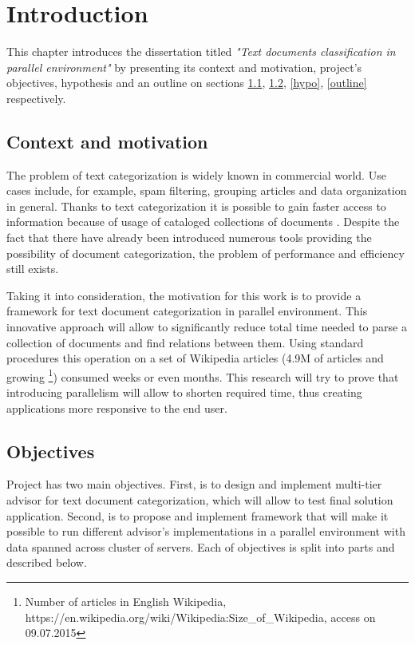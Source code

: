 \chapter{Introduction}
\label{int}

This chapter introduces the dissertation titled \textit{"Text documents classification in parallel environment"} by presenting its context and motivation, project’s objectives, hypothesis and an outline on sections \ref{con_mon}, \ref{obj}, \ref{hypo}, \ref{outline} respectively.

\section{Context and motivation}
\label{con_mon}
The problem of text categorization is widely known in commercial world. Use cases include, for example, spam filtering, grouping articles and data organization in general. Thanks to text categorization it is possible to gain faster access to information because of usage of cataloged collections of documents \cite{aut_wiki_cat_8}. Despite the fact that there have already been introduced numerous tools providing the possibility of document categorization, the problem of performance and efficiency still exists.

Taking it into consideration, the motivation for this work is to provide a framework for text document categorization in parallel environment. This innovative approach will allow to significantly reduce total time needed to parse a collection of documents and find relations between them. Using standard procedures this operation on a set of Wikipedia articles (4.9M of articles and growing \cite{wiki_art_num} \footnote{Number of articles in English Wikipedia, https://en.wikipedia.org/wiki/Wikipedia:Size\_of\_Wikipedia, access on 09.07.2015}) consumed weeks or even months. This research will try to prove that introducing parallelism will allow to shorten required time, thus creating applications more responsive to the end user.

\section{Objectives}
\label{obj}
Project has two main objectives. First, is to design and implement multi-tier advisor for text document categorization, which will allow to test final solution application. Second, is to propose and implement framework that will make it possible to run different advisor's implementations in a parallel environment with data spanned across cluster of servers. Each of objectives is split into parts and described below.


